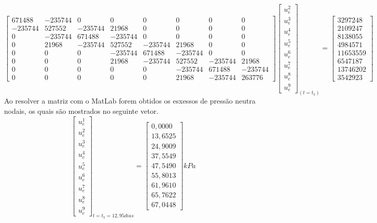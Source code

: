 \documentclass{article} %
\begin{document}
\begin{equation*}
\begin{bmatrix}
671488& -235744& 0& 0& 0& 0& 0& 0\\
-235744&527552&-235744&21968& 0& 0& 0& 0\\
0&-235744&671488&-235744& 0& 0& 0& 0\\
0&21968&-235744&527552&-235744&21968& 0& 0\\
0&0&0& -235744&671488&-235744& 0& 0\\
0&0&0&21968&-235744&527552&-235744&21968\\
0&0&0&0&0&-235744&671488&-235744\\
0&0&0&0&0&21968&-235744&263776
\end{bmatrix}\begin{bmatrix}
u_e^2\\
u_e^3\\
u_e^4\\
u_e^5\\
u_e^6\\
u_e^7\\
u_e^8\\
u_e^9
\end{bmatrix}_{(t=t_7)}
=\begin{bmatrix}
3297248\\
2109247\\
8138055\\
4984571\\
11653559\\
6547187\\
13746202\\
3542923
\end{bmatrix}
\end{equation*}
\indent Ao resolver a matriz com o MatLab forem obtidos os esxessos de pressão neutra nodais, os quais são mostrados no seguinte vetor.
\begin{equation}\label{t7}
\begin{bmatrix}
u_e^1\\
u_e^2\\
u_e^3\\
u_e^4\\
u_e^5\\
u_e^6\\
u_e^7\\
u_e^8\\
u_e^9
\end{bmatrix}_{t=t_7=12,95dias}=\begin{bmatrix}
0,0000\\
13,6525\\
24,9009\\
37,5549\\
47,5490\\
55,8013\\
61,9610\\
65,7622\\
67,0448
\end{bmatrix}kPa
\end{equation}
\end{document}
